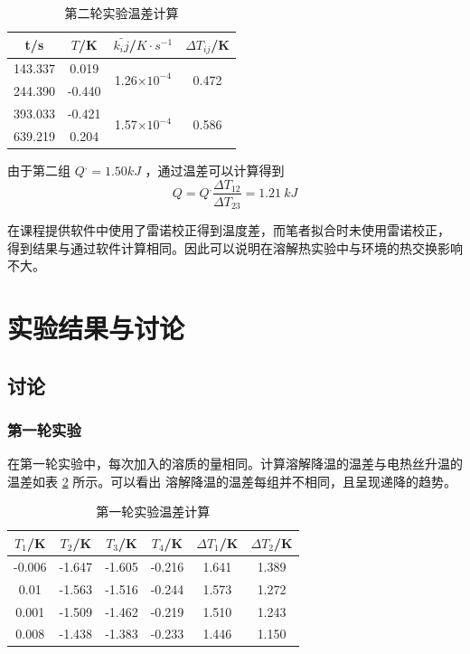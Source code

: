 \documentclass[cn,hazy,pku,12pt,normal,math=newtx,cite=super]{elegantnote}
\begin{document}
\begin{table}[]
    \centering
    \caption{第二轮实验温差计算}
    \label{06}
    \begin{tabular}{cccc}
    \hline
    t/s     & $T$/K  & $\bar{k_ij}$/$K \cdot s^{-1}$         & $\Delta T_{ij}$/K                  \\ \hline
    143.337 & 0.019  & \multirow{2}{*}{1.26$\times 10^{-4}$} & \multirow{2}{*}{0.472} \\
    244.390 & -0.440 &                                       &                               \\
    393.033 & -0.421 & \multirow{2}{*}{1.57$\times 10^{-4}$} & \multirow{2}{*}{0.586}  \\
    639.219 & 0.204  &                                       &                               \\ \hline
    \end{tabular}
\end{table}

由于第二组 $Q^, = 1.50 kJ$ ，通过温差可以计算得到
$$
    Q = Q^, \frac{\Delta T_{12}}{\Delta T_{23}} = 1.21\ kJ
$$

在课程提供软件中使用了雷诺校正得到温度差，而笔者拟合时未使用雷诺校正，
得到结果与通过软件计算相同。因此可以说明在溶解热实验中与环境的热交换影响不大。

\section{实验结果与讨论}
\subsection[short]{讨论}
\subsubsection[short]{第一轮实验}

在第一轮实验中，每次加入的溶质的量相同。计算溶解降温的温差与电热丝升温的温差如表 \ref{07} 所示。可以看出
溶解降温的温差每组并不相同，且呈现递降的趋势。

\begin{table}[h]
    \centering
    \caption{第一轮实验温差计算}
    \label{07}
    \begin{tabular}{cccccc}
    \hline
    $T_1$/K & $T_2$/K & $T_3$/K & $T_4$/K & $\Delta T_1$/K & $\Delta T_2$/K \\ \hline
    -0.006  & -1.647  & -1.605  & -0.216  & 1.641          & 1.389          \\
    0.01    & -1.563  & -1.516  & -0.244  & 1.573          & 1.272          \\
    0.001   & -1.509  & -1.462  & -0.219  & 1.510           & 1.243          \\
    0.008   & -1.438  & -1.383  & -0.233  & 1.446          & 1.150           \\ \hline
    \end{tabular}
\end{table}
\end{document}
